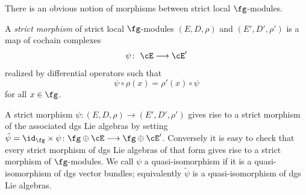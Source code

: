 There is an obvious notion of morphisms between strict local $\fg$-modules.
\begin{dfn}
	A \emph{strict morphism} of strict local $\fg$-modules	$(E,D,\rho)$ and $(E',D',\rho')$ is a map of cochain complexes
	\begin{equation*}
	\psi \colon \ \cE \longrightarrow \cE'
	\end{equation*}
	realized by differential operators such that
	\begin{equation*}
	\psi \circ \rho(x) = \rho'(x) \circ \psi
	\end{equation*}
	for all $x \in \fg$.
\end{dfn}
A strict morphism $\psi \colon (E,D,\rho) \longrightarrow (E',D',\rho')$ gives rise to a strict morphism of the associated dgs Lie algebras by setting $\tilde{\psi} = \id_{\fg} \times \psi \colon \fg \oplus \cE \longrightarrow \fg \oplus \cE'$. Conversely it is easy to check that every strict morphism of dgs Lie algebras of that form gives rise to a strict morphism of $\fg$-modules. We call $\psi$ a quasi-isomorphism if it is a quasi-isomorphism of dgs vector bundles; equivalently $\tilde{\psi}$ is a quasi-isomorphism of dgs Lie algebras.

